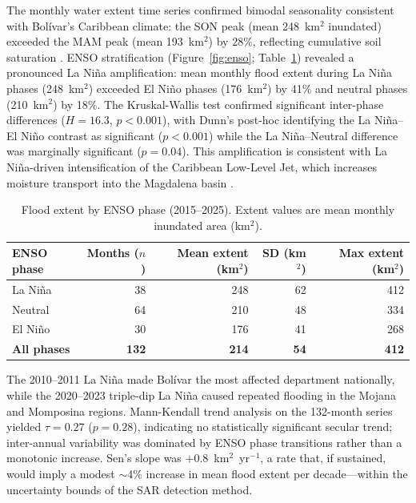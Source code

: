 \documentclass{article}
\begin{document}
The monthly water extent time series confirmed bimodal seasonality consistent with Bol\'ivar's Caribbean climate: the SON peak (mean 248~km$^2$ inundated) exceeded the MAM peak (mean 193~km$^2$) by 28\%, reflecting cumulative soil saturation \citep{Urrea2019}. ENSO stratification (Figure~\ref{fig:enso}; Table~\ref{tab:enso}) revealed a pronounced La Ni\~na amplification: mean monthly flood extent during La Ni\~na phases (248~km$^2$) exceeded El Ni\~no phases (176~km$^2$) by 41\% and neutral phases (210~km$^2$) by 18\%. The Kruskal-Wallis test confirmed significant inter-phase differences ($H = 16.3$, $p < 0.001$), with Dunn's post-hoc identifying the La Ni\~na--El Ni\~no contrast as significant ($p < 0.001$) while the La Ni\~na--Neutral difference was marginally significant ($p = 0.04$). This amplification is consistent with La Ni\~na-driven intensification of the Caribbean Low-Level Jet, which increases moisture transport into the Magdalena basin \citep{Poveda2001, Salas2023, Arias2021}.

\begin{table}[htbp]
\caption{Flood extent by ENSO phase (2015--2025). Extent values are mean monthly inundated area (km$^2$).}
\label{tab:enso}
\centering
\footnotesize
\begin{tabular}{lrrrr}
\toprule
\textbf{ENSO phase} & \textbf{Months ($n$)} & \textbf{Mean extent (km$^2$)} & \textbf{SD (km$^2$)} & \textbf{Max extent (km$^2$)} \\
\midrule
La Ni\~na  & 38  & 248 & 62 & 412 \\
Neutral    & 64  & 210 & 48 & 334 \\
El Ni\~no  & 30  & 176 & 41 & 268 \\
\midrule
\textbf{All phases} & \textbf{132} & \textbf{214} & \textbf{54} & \textbf{412} \\
\bottomrule
\end{tabular}
\end{table}

The 2010--2011 La Ni\~na made Bol\'ivar the most affected department nationally, while the 2020--2023 triple-dip La Ni\~na caused repeated flooding in the Mojana and Momposina regions. Mann-Kendall trend analysis on the 132-month series yielded $\tau = 0.27$ ($p = 0.28$), indicating no statistically significant secular trend; inter-annual variability was dominated by ENSO phase transitions rather than a monotonic increase. Sen's slope was $+0.8$~km$^2$~yr$^{-1}$, a rate that, if sustained, would imply a modest $\sim$4\% increase in mean flood extent per decade---within the uncertainty bounds of the SAR detection method.
\end{document}

